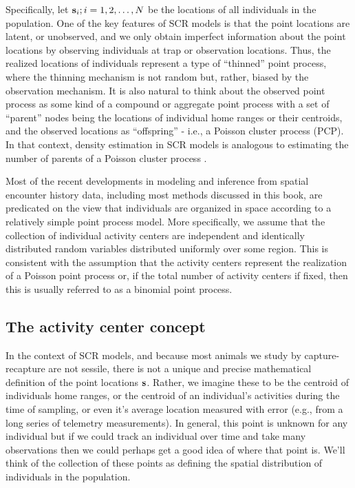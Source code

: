 Specifically, let ${\bf s}_{i}; i=1,2,\ldots,N$ be the locations of
all individuals in the population.  One of the key features of SCR
models is that the point locations are latent, or unobserved, and we
only obtain imperfect information about the point locations by
observing individuals at trap or observation locations.  Thus, the
realized locations of individuals represent a type of ``thinned''
point process, where the thinning mechanism is not random but, rather,
biased by the observation mechanism.  It is also natural to think
about the observed point process as some kind of a compound or
aggregate point process with a set of ``parent'' nodes being the
locations of individual home ranges or their centroids, and the
observed locations as ``offspring'' - i.e., a Poisson cluster process
(PCP). In that context, density estimation in SCR models is analogous
to estimating the number of parents of a Poisson cluster process
\citep{chandler_royle:2012}.


Most of the recent developments in modeling and inference from spatial
encounter history data, including most methods discussed in this book,
are predicated on the view that individuals are organized in space
according to a relatively simple point process model. More
specifically, we assume that the collection of individual activity
centers are independent and identically distributed random variables
distributed uniformly over some region. This is consistent with the
assumption that the activity centers represent the realization of a
Poisson point process or, if the total number of activity centers if
fixed, then this is usually referred to as a binomial point process.


\subsection{The activity center concept}

In the context of SCR models, and because most animals we study by
capture-recapture are not sessile, there is not a unique and precise
mathematical definition of the point locations ${\bf s}$.  Rather, we
imagine these to be the centroid of individuals home ranges, or the
centroid of an individual's activities during the time of sampling, or
even it's average location measured with error (e.g., from a long
series of telemetry measurements). In general, this point is unknown
for any individual but if we could track an individual over time and
take many observations then we could perhaps get a good idea of where
that point is.  We'll think of the collection of these points as
defining the spatial distribution of individuals in the population.



